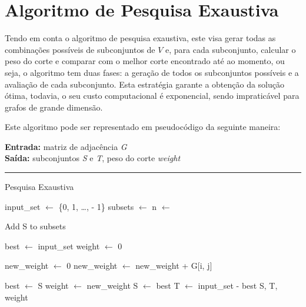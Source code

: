 \documentclass[mirror]{revdetua}
\begin{document}
\section{Algoritmo de Pesquisa Exaustiva}

Tendo em conta o algoritmo de pesquisa exaustiva, este visa gerar todas as combinações possíveis de subconjuntos de $V$ e, para cada subconjunto, calcular o peso do corte e comparar com o melhor corte encontrado até ao momento, ou seja, o algoritmo tem duas fases: a geração de todos os subconjuntos possíveis e a avaliação de cada subconjunto. Esta estratégia garante a obtenção da solução ótima, todavia, o seu custo computacional é exponencial, sendo impraticável para grafos de grande dimensão.

Este algoritmo pode ser representado em pseudocódigo da seguinte maneira:

\begin{algorithm}[H]
    \raggedright
    \textbf{Entrada:} matriz de adjacência \textit{G} \\
    \textbf{Saída:} subconjuntos \textit{S} e \textit{T}, peso do corte \textit{weight} \\
    \hrule 
    \caption{Pesquisa Exaustiva}
    \begin{algorithmic}[1]
        \State input\_set $\gets$ \{0, 1, \ldots,  - 1\}
        \State subsets $\gets$ 
        \State n $\gets$ 
        
            \State Add S to subsets
            \EndFor
        \EndFor
        
        \State best $\gets$ input\_set
        \State weight $\gets$ 0
        
            \State new\_weight $\gets$ 0
                    \State new\_weight $\gets$ new\_weight + G[i, j]
                \EndFor
            \EndFor
            
            \State best $\gets$ S
            \State weight $\gets$ new\_weight
            \EndIf
        \EndFor
        \State S $\gets$ best
        \State T $\gets$ input\_set - best
        \State \Return S, T, weight
    \end{algorithmic}
\end{algorithm}
\end{document}

